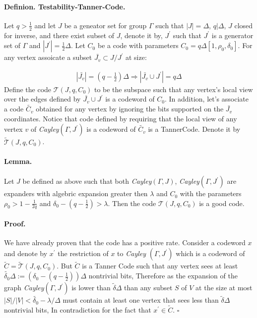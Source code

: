 \documentclass[sigplan,screen]{acmart}
\newcommand{\Jvv}{ \bar{J_{v}} }
\newcommand{\Cvv}{ \tilde{C_{v}} }
\begin{document}
\begin{multicols*}{2}
  \paragraph{Definion. Testability-Tanner-Code.} Let $q > \frac{1}{2}$ and let $J$ be a geneator set for group $\Gamma$ such that $|J| = \Delta$, $q | \Delta $, $J$ closed for inverse, and there exist subset of $J$, denote it by, $J^{\prime}$ such that $J^{\prime}$ is a generator set of $\Gamma$ and $|J^{\prime}| = \frac{1}{2}\Delta$. Let $C_{0}$ be a code with parameters $C_{0} = q\Delta \left[1, \rho_{0}, \delta_{0}\right]$. For any vertex assoicate a subset $\Jvv \subset J/J^{\prime}$ at size: 

  \begin{equation*}
    \begin{split}
      |\Jvv| = \left( q - \frac{1}{2} \right)\Delta \Rightarrow |\Jvv \cup J^{\prime}| = q\Delta
    \end{split}
  \end{equation*}
  Define the code $\mathcal{T}\left(J, q , C_{0}\right)$ to be the subspace such that any vertex's local view over the edges defined by $\Jvv \cup J^{\prime}$ is a codeword of $C_{0}$. In addition, let's associate a code $\Cvv$ obtained for any vertex by ignoring the bits supported on the $\Jvv$ coordinates. Notice that code defined by requiring that the local view of any vertex $v$ of \emph{Cayley}$\left(\Gamma, J^{\prime} \right)$ is a codeword of $\Cvv$ is a TannerCode. Denote it by $ \tilde{\mathcal{T}}\left(J, q ,C_{0}\right)$.   

  \paragraph{Lemma.} Let $J$ be defined as above such that both \emph{Cayley}$\left( \Gamma, J \right)$, \emph{Cayley}$\left( \Gamma, J^{\prime} \right)$ are expanders with algebric expansion greater then $\lambda$ and $C_0$ with the parameters $\rho_{0} > 1 - \frac{1}{2q}$ and $ \delta_{0} - \left( q - \frac{1}{2} \right) > \lambda$. Then the code $\mathcal{T}\left(J, q ,C_{0}\right)$ is a good code. 
  \paragraph{Proof.} We have already proven that the code has a positive rate. Consider a codeword $x$ and denote by $x^{\prime}$ the restriction of $x$ to \emph{Cayley }$\left( \Gamma, J^{\prime}  \right)$ which is a codeword of $\tilde{C} = \tilde{\mathcal{T}}\left(J, q ,C_{0}\right)$. But $\tilde{C}$ is a Tanner Code such that any vertex sees at least $ \tilde{\delta_{0}} \Delta := \left(\delta_{0} - \left( q - \frac{1}{2}   \right) \right)\Delta $ nontrivial bits, Therefore as the expansion of the graph \emph{Cayley}$\left( \Gamma, J^{\prime} \right)$ is lower than $\tilde{\delta}\Delta$ than any subset $S$ of $V$ at the size at most $|S|/|V| < \tilde{\delta_{0}} - \lambda / \Delta $  must contain at least one vertex that sees less than  $\tilde{\delta}\Delta$ nontrivial bits, In contradiction for the fact that $x^{\prime} \in \tilde{C}$. $\square$ 


\end{multicols*}
\end{document}
